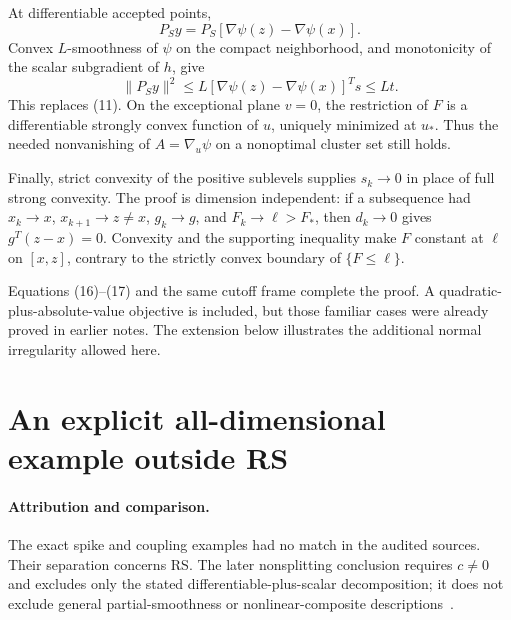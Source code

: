 At differentiable accepted points, \[
 P_Sy=P_S[\nabla\psi(z)-\nabla\psi(x)].
\] Convex \(L\)-smoothness of \(\psi\) on the compact neighborhood, and
monotonicity of the scalar subgradient of \(h\), give \[
 \|P_Sy\|^2
 \le L[\nabla\psi(z)-\nabla\psi(x)]^Ts
 \le Lt.\tag{U.17}
\] This replaces (11). On the exceptional plane \(v=0\), the restriction
of \(F\) is a differentiable strongly convex function of \(u\), uniquely
minimized at \(u_*\). Thus the needed nonvanishing of \(A=\nabla_u\psi\)
on a nonoptimal cluster set still holds.

Finally, strict convexity of the positive sublevels supplies \(s_k\to0\)
in place of full strong convexity. The proof is dimension independent:
if a subsequence had \(x_k\to x\), \(x_{k+1}\to z\ne x\), \(g_k\to g\),
and \(F_k\to\ell>F_*\), then \(d_k\to0\) gives \(g^T(z-x)=0\). Convexity
and the supporting inequality make \(F\) constant at \(\ell\) on
\([x,z]\), contrary to the strictly convex boundary of \(\{F\le\ell\}\).

Equations (16)--(17) and the same cutoff frame complete the proof. A
quadratic-plus-absolute-value objective is included, but those familiar
cases were already proved in earlier notes. The extension below
illustrates the additional normal irregularity allowed here.


\setcounter{section}{6}
\setcounter{theorem}{0}
\setcounter{lemma}{0}
\setcounter{corollary}{0}
\setcounter{proposition}{0}
\setcounter{remark}{0}
\setcounter{equation}{0}
\section{An explicit all-dimensional example outside
RS}\label{U:an-explicit-all-dimensional-example-outside-rs}
\paragraph{Attribution and comparison.}
The exact spike and coupling examples had no match in the audited sources. Their separation concerns RS. The later nonsplitting conclusion requires $c\ne0$ and excludes only the stated differentiable-plus-scalar decomposition; it does not exclude general partial-smoothness or nonlinear-composite descriptions~\cite{geom_Lewis2002,LL}.


